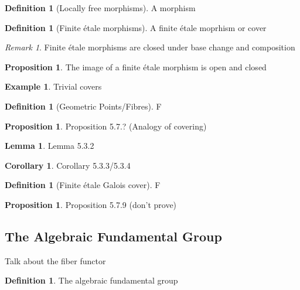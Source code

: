 \documentclass{article}
\theoremstyle{definition}
\newtheorem{lemma}[theorem]{Lemma}
\newtheorem{corollary}[theorem]{Corollary}
\newtheorem{proposition}[theorem]{Proposition}
\newtheorem{definition}[theorem]{Definition}
\newtheorem{example}[theorem]{Example}
\theoremstyle{remark}
\newtheorem*{remark}{Remark}
\begin{document}
\begin{definition}[Locally free morphisms]
	A morphism
\end{definition}

\begin{definition}[Finite \'etale morphisms]
	A finite \'etale moprhism or cover
\end{definition}

\begin{remark}
Finite \'etale morphisms are closed under base change and composition
\end{remark}

\begin{proposition}
	The image of a finite \'etale morphism is open and closed
\end{proposition}

\begin{example}
	Trivial covers
\end{example}

\begin{definition}[Geometric Points/Fibres]
	F
\end{definition}

\begin{proposition}
	Proposition 5.7.? (Analogy of covering)
\end{proposition}

\begin{lemma}
	Lemma 5.3.2
\end{lemma}

\begin{corollary}
	Corollary 5.3.3/5.3.4
\end{corollary}

\begin{definition}[Finite \'etale Galois cover]
	F
\end{definition}

\begin{proposition}
	Proposition 5.7.9 (don't prove)
\end{proposition}

\subsection{The Algebraic Fundamental Group}

Talk about the fiber functor

\begin{definition}
	The algebraic fundamental group
\end{definition}
\end{document}
